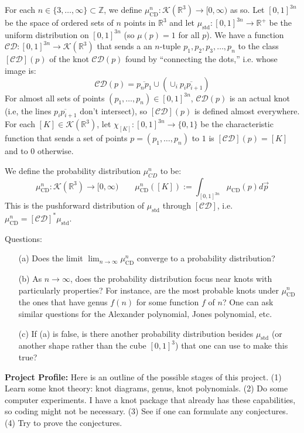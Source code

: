 \documentclass[12pt]{article}
\numberwithin{equation}{section}
\theoremstyle{definition}
\newcommand{\R}{{\mathbb R}}
\newcommand{\Z}{{\mathbb Z}}
\newcommand{\op}{\operatorname}
\begin{document}
 For each $n \in \{3,\dots,\infty\} \subset \Z$, we define $\mu^n_{\op{CD}}:\mathcal{K}(\R^3) \to [0,\infty)$ as so. Let $[0,1]^{3n}$ be the space of ordered sets of $n$ points in $\R^3$ and let $\mu_{\op{std}}:[0,1]^{3n} \to \R^+$ be the uniform distribution on $[0,1]^{3n}$ (so $\mu(p) = 1$ for all $p$). We have a function $\mathcal{CD}:[0,1]^{3n} \to \mathcal{K}(\R^3)$ that sends a an $n$-tuple $p_1,p_2,p_3,\dots,p_n$ to the class $[\mathcal{CD}](p)$ of the knot $\mathcal{CD}(p)$ found by ``connecting the dots,'' i.e. whose image is:
\[\mathcal{CD}(p) = \overline{p_np_1} \cup (\cup_{i} \overline{p_ip_{i+1}})\]
For almost all sets of points $(p_1,\dots,p_n) \in [0,1]^{3n}$, $\mathcal{CD}(p)$ is an actual knot (i.e, the lines $\overline{p_ip_{i+1}}$ don't intersect), so $[\mathcal{CD}](p)$ is defined almost everywhere. For each $[K] \in \mathcal{K}(\R^3)$, let $\chi_{[K]}:[0,1]^{3n} \to \{0,1\}$ be the characteristic function that sends a set of points $p = (p_1,\dots,p_n)$ to $1$ is $[\mathcal{CD}](p) = [K]$ and to $0$ otherwise. 

We define the probability distribution $\mu^n_{CD}$ to be:
\[
\mu_{\op{CD}}^n:\mathcal{K}(\R^3) \to [0,\infty) \qquad \mu_{\op{CD}}^n([K]) := \int_{[0,1]^{3n}} \mu_{\op{CD}}(p) d\vec{p}\]
This is the pushforward distribution of $\mu_{\op{std}}$ through $[\mathcal{CD}]$, i.e. $\mu^n_{\op{CD}} = [\mathcal{CD}]^*\mu_{\op{std}}$.

Questions: 
\begin{enumerate}
\item[(a)] Does the limit $\lim_{n \to \infty} \mu^n_{\op{CD}}$ converge to a probability distribution?
\item[(b)] As $n \to \infty$, does the probability distribution focus near knots with particularly properties? For instance, are the most probable knots under $\mu^n_{\op{CD}}$ the ones that have genus $f(n)$ for some function $f$ of $n$? One can ask similar questions for the Alexander polynomial, Jones polynomial, etc.
\item[(c)] If (a) is false, is there another probability distribution besides $\mu_{\op{std}}$ (or another shape rather than the cube $[0,1]^3$) that one can use to make this true?
\end{enumerate}  

{\bf Project Profile:} Here is an outline of the possible stages of this project. (1) Learn some knot theory: knot diagrams, genus, knot polynomials. (2) Do some computer experiments. I have a knot package that already has these capabilities, so coding might not be necessary. (3) See if one can formulate any conjectures. (4) Try to prove the conjectures.
\end{document}
